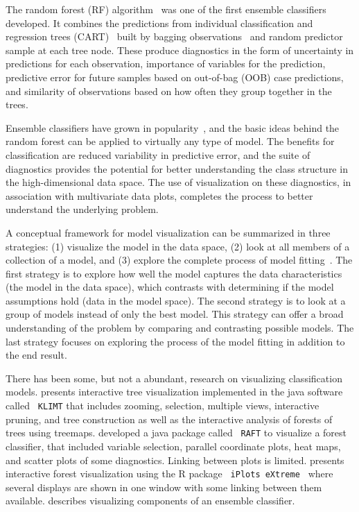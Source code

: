 \documentclass[smallextended,natbib]{svjour3}\usepackage[]{graphicx}\usepackage[]{xcolor}
\begin{document}
The random forest (RF) algorithm~\citep{breiman1996bagging} was one of the first ensemble classifiers developed. It combines the predictions from individual classification and regression trees (CART)~\citep{breiman1984cl} built by bagging observations~\citep{breiman1996bagging} and random predictor sample at each tree node. These produce diagnostics in the form of uncertainty in predictions for each observation, importance of variables for the prediction, predictive error for future samples based on out-of-bag (OOB) case predictions, and similarity of observations based on how often they group together in the trees.

Ensemble classifiers have grown in popularity~\citep{dietterish00, talbot09}, and the basic ideas behind the random forest can be applied to virtually any type of model. The benefits for classification are reduced variability in predictive error, and the suite of diagnostics provides the potential for better understanding the class structure in the high-dimensional data space. The use of visualization on these diagnostics, in association with multivariate data plots, completes the process to better understand the underlying problem.

A conceptual framework for model visualization can be summarized in three strategies: (1) visualize the model in the data space, (2) look at all members of a collection of a model, and (3) explore the complete process of model fitting~\citep{wickham2015visualizing}. The first strategy is to explore how well the model captures the data characteristics (the model in the data space), which contrasts with determining if the model assumptions hold (data in the model space). The second strategy is to look at a group of models instead of only the best model. This strategy can offer a broad understanding of the problem by comparing and contrasting possible models. The last strategy focuses on exploring the process of the model fitting in addition to the end result.

There has been some, but not a abundant, research on visualizing classification models.
\cite{urbanek2002exploring} presents interactive tree visualization implemented in the java software called \verb# KLIMT# that includes zooming, selection, multiple views, interactive pruning, and tree construction as well as the interactive analysis of forests of trees using treemaps. \cite{cutler15raft} developed a java package called \verb# RAFT# to visualize a forest classifier, that included variable selection, parallel coordinate plots, heat maps, and scatter plots of some diagnostics. Linking between plots is limited. \cite{quach2012interactive} presents interactive forest visualization using the R package \verb# iPlots eXtreme # \citep{urbanek2011iplots} where several displays are shown in one window with some linking between them available. \cite{Silva2016} describes visualizing components of an ensemble classifier.
\end{document}
